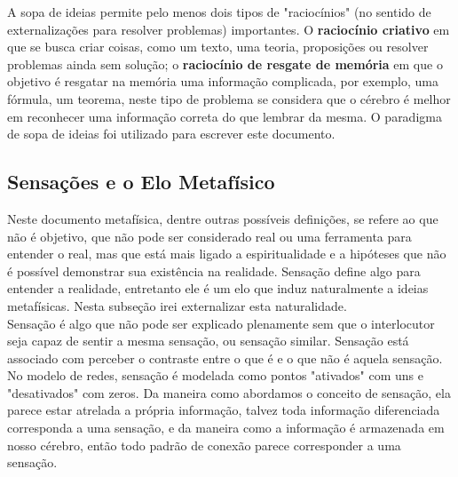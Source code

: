 \documentclass[10pt,a4paper]{report}
\begin{document}
A sopa de ideias permite pelo menos dois tipos de "raciocínios" (no sentido de externalizações para resolver problemas) importantes. O \textbf{raciocínio criativo} em que se busca criar coisas, como um texto, uma teoria, proposições ou resolver problemas ainda sem solução; o \textbf{raciocínio de resgate de memória} em que o objetivo é resgatar na memória uma informação complicada, por exemplo, uma fórmula, um teorema, neste tipo de problema se considera que o cérebro é melhor em reconhecer uma informação correta do que lembrar da mesma. O paradigma de sopa de ideias foi utilizado para escrever este documento.


\subsection{Sensações e o Elo Metafísico}

\hspace{\baselineskip}

Neste documento metafísica, dentre outras possíveis definições, se refere ao que não é objetivo, que não pode ser considerado real ou uma ferramenta para entender o real, mas que está mais ligado a espiritualidade e a hipóteses que não é possível demonstrar sua existência na realidade. Sensação define algo para entender a realidade, entretanto ele é um elo que induz naturalmente a ideias metafísicas. Nesta subseção irei externalizar esta naturalidade.\\

Sensação é algo que não pode ser explicado plenamente sem que o interlocutor seja capaz de sentir a mesma sensação, ou sensação similar. Sensação está associado com perceber o contraste entre o que é e o que não é aquela sensação. No modelo de redes, sensação é modelada como pontos "ativados" com uns e "desativados" com zeros. Da maneira como abordamos o conceito de sensação, ela parece estar atrelada a própria informação, talvez toda informação diferenciada corresponda a uma sensação, e da maneira como a informação é armazenada em nosso cérebro, então todo padrão de conexão parece corresponder a uma sensação.\\
\end{document}
